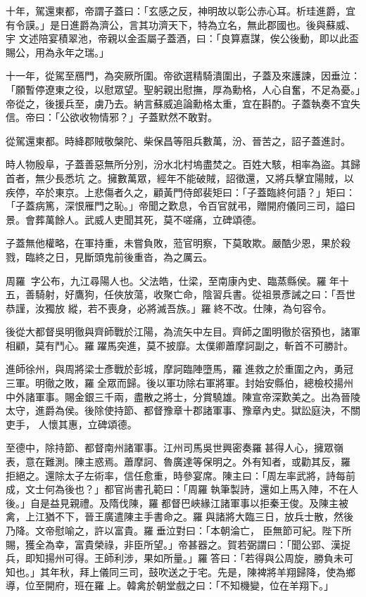\begin{pinyinscope}
 十年，駕還東都，帝謂子蓋曰：「玄感之反，神明故以彰公赤心耳。析珪進爵，宜有令謨。」是日進爵為濟公，言其功濟天下，特為立名，無此郡國也。後與蘇威、宇
 文述陪宴積翠池，帝親以金盃屬子蓋酒，曰：「良算嘉謀，俟公後動，即以此盃賜公，用為永年之瑞。」



 十一年，從駕至鴈門，為突厥所圍。帝欲選精騎潰圍出，子蓋及來護諫，因垂泣：「願暫停遼東之役，以慰眾望。聖躬親出慰撫，厚為勳格，人心自奮，不足為憂。」帝從之，後援兵至，虜乃去。納言蘇威追論勳格太重，宜在斟酌。子蓋執奏不宜失信。帝曰：「公欲收物情邪？」子蓋默然不敢對。



 從駕還東都。時絳郡賊敬槃陀、柴保昌等阻兵數萬，汾、晉苦之，詔子蓋進討。



 時人物殷阜，子蓋善惡無所分別，汾水北村塢盡焚之。百姓大駭，相率為盜。其歸首者，無少長悉坑
 之。擁數萬眾，經年不能破賊，詔徵還，又將兵擊宜陽賊，以疾停，卒於東京。上悲傷者久之，顧黃門侍郎裴矩曰：「子蓋臨終何語？」矩曰：「子蓋病篤，深恨雁門之恥。」帝聞之歎息，令百官就弔，贈開府儀同三司，謚曰景。會葬萬餘人。武威人吏聞其死，莫不嗟痛，立碑頌德。



 子蓋無他權略，在軍持重，未嘗負敗，蒞官明察，下莫敢欺。嚴酷少恩，果於殺戮，臨終之日，見斷頭鬼前後重沓，為之厲云。



 周羅，字公布，九江尋陽人也。父法皓，仕梁，至南康內史、臨蒸縣侯。羅年十五，善騎射，好鷹狗，任俠放蕩，收聚亡命，陰習兵書。從祖景彥誡之曰：「吾世恭謹，汝獨放
 縱，若不喪身，必將滅吾族。」羅終不改。仕陳，為句容令。



 後從大都督吳明徹與齊師戰於江陽，為流矢中左目。齊師之圍明徹於宿預也，諸軍相顧，莫有鬥心。羅躍馬突進，莫不披靡。太僕卿蕭摩訶副之，斬首不可勝計。



 進師徐州，與周將梁士彥戰於彭城，摩訶臨陣墮馬，羅進救之於重圍之內，勇冠三軍。明徹之敗，羅全眾而歸。後以軍功除右軍將軍。封始安縣伯，總檢校揚州中外諸軍事。賜金銀三千兩，盡散之將士，分賞驍雄。陳宣帝深歎美之。出為晉陵太守，進爵為侯。後除使持節、都督豫章十郡諸軍事、豫章內史。獄訟庭決，不關吏手，
 人懷其惠，立碑頌德。



 至德中，除持節、都督南州諸軍事。江州司馬吳世興密奏羅甚得人心，擁眾嶺表，意在難測。陳主惑焉。蕭摩訶、魯廣達等保明之。外有知者，或勸其反，羅拒絕之。還除太子左術率，信任愈重，時參宴席。陳主曰：「周左率武將，詩每前成，文士何為後也？」都官尚書孔範曰：「周羅執筆製詩，還如上馬入陣，不在人後。」自是益見親禮。及隋伐陳，羅都督巴峽緣江諸軍事以拒秦王俊。及陳主被禽，上江猶不下，晉王廣遣陳主手書命之。羅與諸將大臨三日，放兵士散，然後乃降。文帝慰喻之，許以富貴。羅垂泣對曰：「本朝淪亡，
 臣無節可紀。陛下所賜，獲全為幸，富貴榮祿，非臣所望。」帝甚器之。賀若弼謂曰：「聞公郢、漢捉兵，即知揚州可得。王師利涉，果如所量。」羅答曰：「若得與公周旋，勝負未可知也。」其年秋，拜上儀同三司，鼓吹送之于宅。先是，陳裨將羊翔歸降，使為鄉導，位至開府，班在羅上。韓禽於朝堂戲之曰：「不知機變，位在羊翔下。」




\end{pinyinscope}

